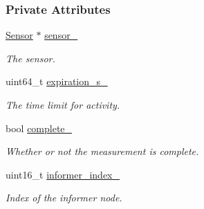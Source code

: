 \subsubsection*{Private Attributes}
\begin{DoxyCompactItemize}
\item 
\mbox{\label{classosse_1_1collaborate_1_1_subsystem_sensing_a503fdc0d0f764dd7d61638d2ba23926e}} 
\hyperlink{classosse_1_1collaborate_1_1_sensor}{Sensor} $\ast$ \hyperlink{classosse_1_1collaborate_1_1_subsystem_sensing_a503fdc0d0f764dd7d61638d2ba23926e}{sensor\+\_\+}
\begin{DoxyCompactList}\small\item\em The sensor. \end{DoxyCompactList}\item 
\mbox{\label{classosse_1_1collaborate_1_1_subsystem_sensing_ae8bebb9418505e5cccf99c4b6f9bee49}} 
uint64\+\_\+t \hyperlink{classosse_1_1collaborate_1_1_subsystem_sensing_ae8bebb9418505e5cccf99c4b6f9bee49}{expiration\+\_\+s\+\_\+}
\begin{DoxyCompactList}\small\item\em The time limit for activity. \end{DoxyCompactList}\item 
\mbox{\label{classosse_1_1collaborate_1_1_subsystem_sensing_adc94dcf762ca1d4b969a0a503c5e3ed6}} 
bool \hyperlink{classosse_1_1collaborate_1_1_subsystem_sensing_adc94dcf762ca1d4b969a0a503c5e3ed6}{complete\+\_\+}
\begin{DoxyCompactList}\small\item\em Whether or not the measurement is complete. \end{DoxyCompactList}\item 
\mbox{\label{classosse_1_1collaborate_1_1_subsystem_sensing_a7916855d290de78a685cfd668631e863}} 
uint16\+\_\+t \hyperlink{classosse_1_1collaborate_1_1_subsystem_sensing_a7916855d290de78a685cfd668631e863}{informer\+\_\+index\+\_\+}
\begin{DoxyCompactList}\small\item\em Index of the informer node. \end{DoxyCompactList}\item 

\end{DoxyCompactItemize}
